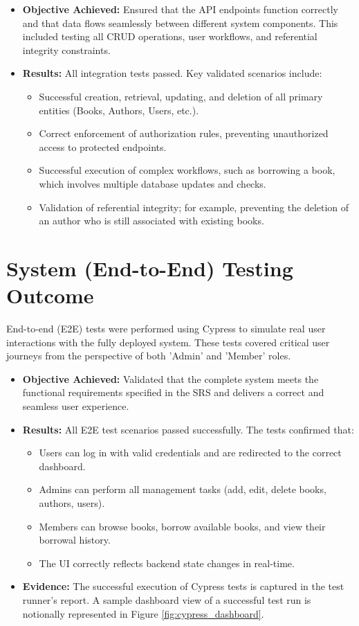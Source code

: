\begin{itemize}
    \item \textbf{Objective Achieved:} Ensured that the API endpoints function correctly and that data flows seamlessly between different system components. This included testing all CRUD operations, user workflows, and referential integrity constraints.
    \item \textbf{Results:} All integration tests passed. Key validated scenarios include:
    \begin{itemize}
        \item Successful creation, retrieval, updating, and deletion of all primary entities (Books, Authors, Users, etc.).
        \item Correct enforcement of authorization rules, preventing unauthorized access to protected endpoints.
        \item Successful execution of complex workflows, such as borrowing a book, which involves multiple database updates and checks.
        \item Validation of referential integrity; for example, preventing the deletion of an author who is still associated with existing books.
    \end{itemize}
\end{itemize}

\section{System (End-to-End) Testing Outcome}
\label{sec:system_testing_outcome}
End-to-end (E2E) tests were performed using Cypress to simulate real user interactions with the fully deployed system. These tests covered critical user journeys from the perspective of both 'Admin' and 'Member' roles.

\begin{itemize}
    \item \textbf{Objective Achieved:} Validated that the complete system meets the functional requirements specified in the SRS and delivers a correct and seamless user experience.
    \item \textbf{Results:} All E2E test scenarios passed successfully. The tests confirmed that:
    \begin{itemize}
        \item Users can log in with valid credentials and are redirected to the correct dashboard.
        \item Admins can perform all management tasks (add, edit, delete books, authors, users).
        \item Members can browse books, borrow available books, and view their borrowal history.
        \item The UI correctly reflects backend state changes in real-time.
    \end{itemize}
    \item \textbf{Evidence:} The successful execution of Cypress tests is captured in the test runner's report. A sample dashboard view of a successful test run is notionally represented in Figure \ref{fig:cypress_dashboard}.
\end{itemize}

